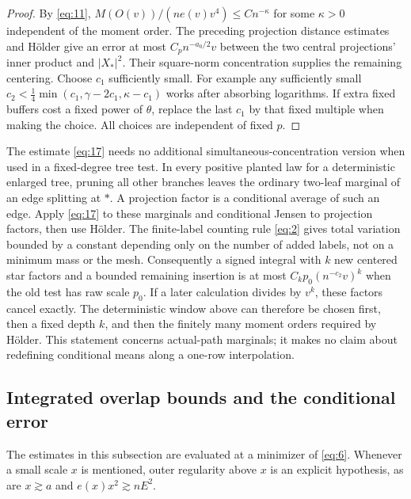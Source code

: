 \begin{proof}
By \eqref{eq:11}, $M(O(v))/(ne(v)v^4)\le Cn^{-\kappa}$ for some
$\kappa>0$ independent of the moment order.  The preceding projection
distance estimates and H\"older give an error at most
$C_pn^{-a_0/2}v$ between the two central projections' inner product
and $|X_*|^2$.  Their square-norm concentration supplies the remaining
centering.  Choose $c_1$ sufficiently small.  For example any sufficiently
small
$c_2<\frac14\min(c_1,\gamma-2c_1,\kappa-c_1)$ works after absorbing
logarithms.  If extra fixed buffers cost a fixed power of $\theta$,
replace the last $c_1$ by that fixed multiple when making the choice.
All choices are independent of fixed $p$.
\end{proof}

\begin{remark}\label{comp:good-split-trees}
The estimate \eqref{eq:17} needs no additional simultaneous-concentration
version when used in a fixed-degree tree test.  In every positive
planted law for a deterministic enlarged tree, pruning all other
branches leaves the ordinary two-leaf marginal of an edge splitting at
$*$.  A projection factor is a conditional average of such an edge.
Apply \eqref{eq:17} to these marginals and conditional Jensen to
projection factors, then use H\"older.  The finite-label counting rule
\eqref{eq:2} gives total variation bounded by a constant depending only
on the number of added labels, not on a minimum mass or the mesh.
Consequently a signed integral with $k$ new centered star factors and
a bounded remaining insertion is at most
$C_kp_0(n^{-c_2}v)^k$ when the old test has raw scale $p_0$.
If a later calculation divides by $v^k$, these factors cancel exactly.
The deterministic window above can therefore be chosen first, then a
fixed depth $k$, and then the finitely many moment orders required by
H\"older.  This statement concerns actual-path marginals; it makes no
claim about redefining conditional means along a one-row interpolation.
\end{remark}

\subsection{Integrated overlap bounds and the conditional error}

The estimates in this subsection are evaluated at a minimizer of
\eqref{eq:6}.  Whenever a small scale $x$ is mentioned, outer regularity
above $x$ is an explicit hypothesis, as are
$x\gtrsim a$ and $e(x)x^2\gtrsim nE^2$.

